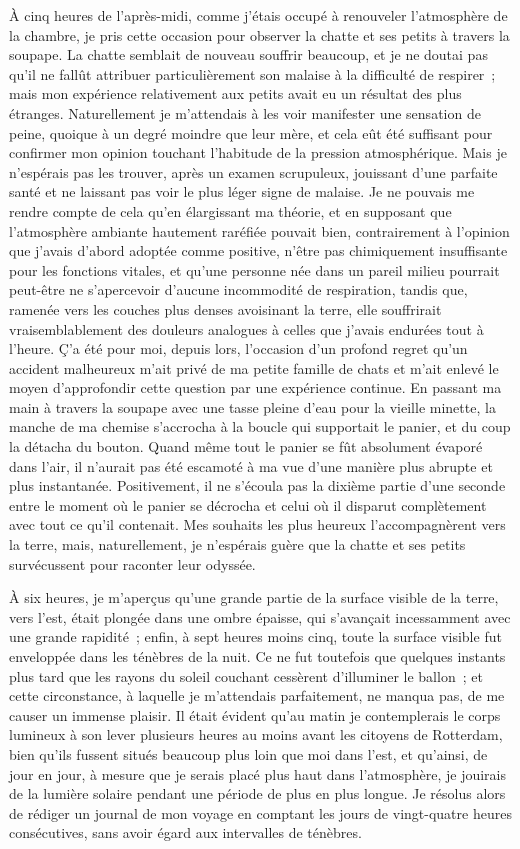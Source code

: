 \documentclass[french,twoside]{book} %
\begin{document}
À cinq heures de l’après-midi, comme j’étais occupé à renouveler l’atmosphère de la chambre, je pris cette occasion pour observer la chatte et ses petits à travers la soupape. La chatte semblait de nouveau souffrir beaucoup, et je ne doutai pas qu’il ne fallût attribuer particulièrement son malaise à la difficulté de respirer ; mais mon expérience relativement aux petits avait eu un résultat des plus étranges. Naturellement je m’attendais à les voir manifester une sensation de peine, quoique à un degré moindre que leur mère, et cela eût été suffisant pour confirmer mon opinion touchant l’habitude de la pression atmosphérique. Mais je n’espérais pas les trouver, après un examen scrupuleux, jouissant d’une parfaite santé et ne laissant pas voir le plus léger signe de malaise. Je ne pouvais me rendre compte de cela qu’en élargissant ma théorie, et en supposant que l’atmosphère ambiante hautement raréfiée pouvait bien, contrairement à l’opinion que j’avais d’abord adoptée comme positive, n’être pas chimiquement insuffisante pour les fonctions vitales, et qu’une personne née dans un pareil milieu pourrait peut-être ne s’apercevoir d’aucune incommodité de respiration, tandis que, ramenée vers les couches plus denses avoisinant la terre, elle souffrirait vraisemblablement des douleurs analogues à celles que j’avais endurées tout à l’heure. Ç’a été pour moi, depuis lors, l’occasion d’un profond regret qu’un accident malheureux m’ait privé de ma petite famille de chats et m’ait enlevé le moyen d’approfondir cette question par une expérience continue. En passant ma main à travers la soupape avec une tasse pleine d’eau pour la vieille minette, la manche de ma chemise s’accrocha à la boucle qui supportait le panier, et du coup la détacha du bouton. Quand même tout le panier se fût absolument évaporé dans l’air, il n’aurait pas été escamoté à ma vue d’une manière plus abrupte et plus instantanée. Positivement, il ne s’écoula pas la dixième partie d’une seconde entre le moment où le panier se décrocha et celui où il disparut complètement avec tout ce qu’il contenait. Mes souhaits les plus heureux l’accompagnèrent vers la terre, mais, naturellement, je n’espérais guère que la chatte et ses petits survécussent pour raconter leur odyssée.\par
À six heures, je m’aperçus qu’une grande partie de la surface visible de la terre, vers l’est, était plongée dans une ombre épaisse, qui s’avançait incessamment avec une grande rapidité ; enfin, à sept heures moins cinq, toute la surface visible fut enveloppée dans les ténèbres de la nuit. Ce ne fut toutefois que quelques instants plus tard que les rayons du soleil couchant cessèrent d’illuminer le ballon ; et cette circonstance, à laquelle je m’attendais parfaitement, ne manqua pas, de me causer un immense plaisir. Il était évident qu’au matin je contemplerais le corps lumineux à son lever plusieurs heures au moins avant les citoyens de Rotterdam, bien qu’ils fussent situés beaucoup plus loin que moi dans l’est, et qu’ainsi, de jour en jour, à mesure que je serais placé plus haut dans l’atmosphère, je jouirais de la lumière solaire pendant une période de plus en plus longue. Je résolus alors de rédiger un journal de mon voyage en comptant les jours de vingt-quatre heures consécutives, sans avoir égard aux intervalles de ténèbres.\par
\end{document}
